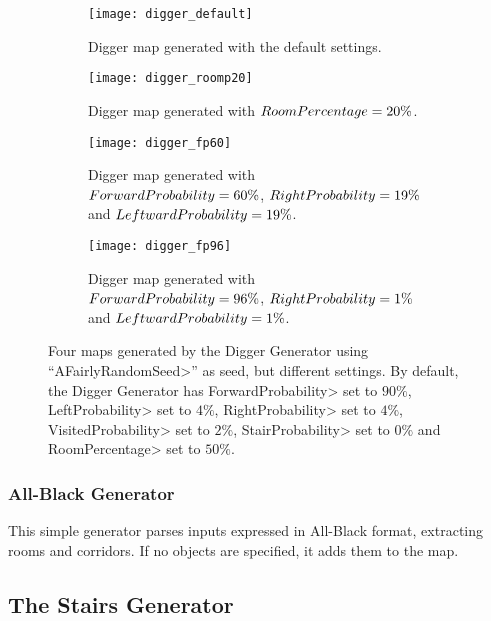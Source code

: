 \begin{figure}[tp]
\centering
\begin{subfigure}[t]{0.48\linewidth}
\texttt{[image: digger\_default]}
\caption{Digger map generated with the default settings.}
\end{subfigure}
\hfill
\begin{subfigure}[t]{0.48\linewidth}
\texttt{[image: digger\_roomp20]}
\caption{Digger map generated with $Room\-Per\-cent\-age = 20\%$.}
\end{subfigure}

\begin{subfigure}[t]{0.48\linewidth}
\texttt{[image: digger\_fp60]}
\caption{Digger map generated with $For\-ward\-Prob\-a\-bil\-i\-ty = 60\%$, $Right\-Prob\-a\-bil\-i\-ty = 19\%$ and $Left\-ward\-Prob\-a\-bil\-i\-ty = 19\%$.}
\end{subfigure}
\hfill
\begin{subfigure}[t]{0.48\linewidth}
\texttt{[image: digger\_fp96]}
\caption{Digger map generated with $For\-ward\-Prob\-a\-bil\-i\-ty = 96\%$, $Right\-Prob\-a\-bil\-i\-ty = 1\%$ and $Left\-ward\-Prob\-a\-bil\-i\-ty = 1\%$.}
\end{subfigure}
\caption[Four maps generated by the Digger Generator using ``\<AFairlyRandomSeed>'' as seed, but different settings.]{Four maps generated by the Digger Generator using ``\<AFairlyRandomSeed>'' as seed, but different settings. By default, the Digger Generator has \<For\-ward\-Prob\-a\-bil\-i\-ty> set to $90\%$, \<Left\-Prob\-a\-bil\-i\-ty> set to $4\%$, \<Right\-Prob\-a\-bil\-i\-ty> set to $4\%$, \<Vis\-it\-ed\-Prob\-a\-bil\-i\-ty> set to $2\%$, \<Stair\-Prob\-a\-bil\-i\-ty> set to $0\%$ and \<Room\-Per\-cent\-age> set to $50\%$.}
\label{fig:diggers}
\end{figure}


\subsubsection{All-Black Generator}

This simple generator parses inputs expressed in All-Black format, extracting rooms and corridors. If no objects are specified, it adds them to the map.


\subsection{The Stairs Generator}

